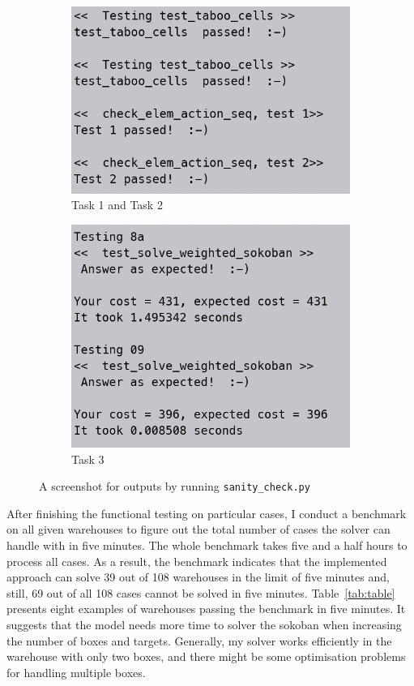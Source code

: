 \documentclass{article}
\begin{document}
\begin{figure}
\centering
\begin{subfigure}{.5\textwidth}
  \centering
  \includegraphics[width=0.6\linewidth]{image/Test1.png}
  \caption{Task 1 and Task 2}
  \label{fig:test1}
\end{subfigure}%
\begin{subfigure}{.5\textwidth}
  \centering
  \includegraphics[width=.5\linewidth]{image/Test2.png}
  \caption{Task 3}
  \label{fig:test2}
\end{subfigure}
\caption{A screenshot for outputs by running \texttt{sanity\_check.py}}
\label{fig:test}
\end{figure}

After finishing the functional testing on particular cases, I conduct a benchmark on all given warehouses to figure out the total number of cases the solver can handle with in five minutes. The whole benchmark takes five and a half hours to process all cases. As a result, the benchmark indicates that the implemented approach can solve 39 out of 108 warehouses in the limit of five minutes and, still, 69 out of all 108 cases cannot be solved in five minutes. Table~\ref{tab:table} presents eight examples of warehouses passing the benchmark in five minutes. It suggests that the model needs more time to solver the sokoban when increasing the number of boxes and targets. Generally, my solver works efficiently in the warehouse with only two boxes, and there might be some optimisation problems for handling multiple boxes.
\end{document}
